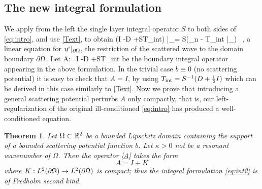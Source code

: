 \documentclass[11pt,final]{amsart}
\newtheorem{thm}{Theorem}[section]
\theoremstyle{definition}
\numberwithin{remark}{section}
\numberwithin{definition}{section}
\numberwithin{pro}{section}
\begin{document}
\subsection{The new integral formulation}
We apply from the left the single layer integral operator $S$
to both sides of \eqref{eq:intro}, and use \eqref{Text}, to obtain
\be
\left(\half I -D +ST_{\rm int}\right) \us|_\pO = S\left(\ui_n - T_{\rm int} \ui|_{\pO}\right)
~,
\label{eq:int2}
\ee
a linear
equation for $u^{\mbox{\tiny s}}|_{\partial\Omega}$, the restriction of the scattered wave to the domain boundary ${\partial\Omega}$.
Let
\be
A:=\half I -D +ST_{\rm int}
\label{A}
\ee
be the boundary integral operator appearing in the above formulation.
In the trivial case $b\equiv 0$ (no scattering potential)
it is easy to check that $A = I$, by using
$T_{\rm int} = S^{-1}(D+\mbox{\small $\frac{1}{2}$} I)$ which can be derived in this case similarly to \eqref{Text}.
Now we prove that introducing a general scattering potential perturbs $A$ only compactly,
that is, our left-regularization of the original ill-conditioned \eqref{eq:intro}
has produced a well-conditioned equation.
\begin{thm} %
Let $\Omega\subset\mathbb{R}^2$ be a bounded Lipschitz domain
containing the support of a bounded scattering potential function $b$.
Let $\kappa>0$ not be a resonant wavenumber of $\Omega$.
Then the operator \eqref{A} takes the form $$A = I + K$$
where $K:L^2({\partial\Omega})\to L^2({\partial\Omega})$ is compact; thus the integral formulation \eqref{eq:int2}
is of Fredholm second kind.
\label{t:2ndkind}
\end{thm}  %
\end{document}
